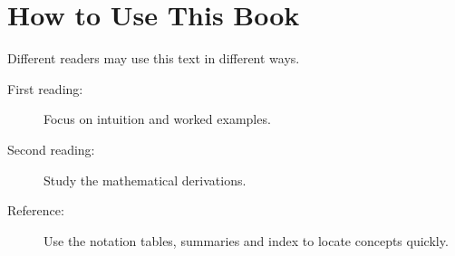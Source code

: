 \chapter*{How to Use This Book}

Different readers may use this text in different ways.

\begin{description}
	\item[First reading:] Focus on intuition and worked examples.
	\item[Second reading:] Study the mathematical derivations.
	\item[Reference:] Use the notation tables, summaries and index to locate concepts quickly.
\end{description}

